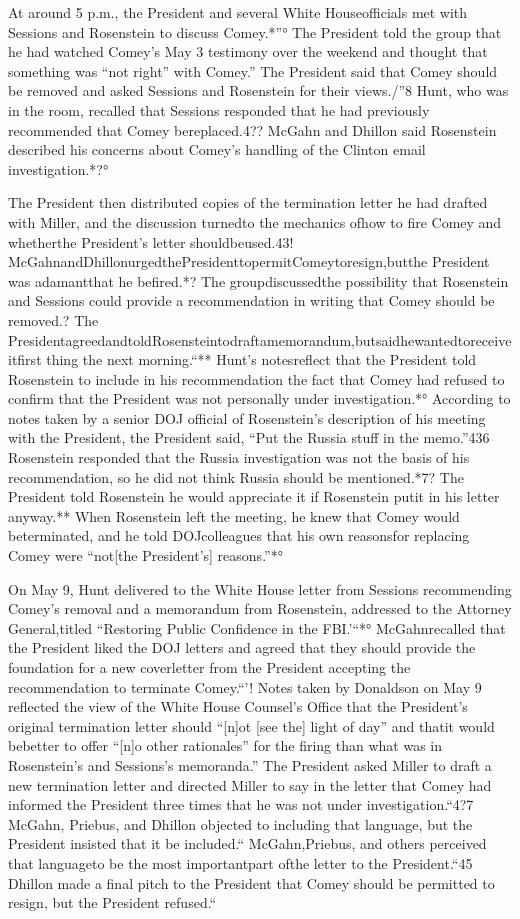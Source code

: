 {At around 5 p.m., the President and several White Houseofficials met with Sessions and Rosenstein to discuss Comey.*”° The President told the group that he had watched Comey’s May 3 testimony over the weekend and thought that something was “not right” with Comey.” The President said that Comey should be removed and asked Sessions and Rosenstein for their views./”8 Hunt, who was in the room, recalled that Sessions responded that he had previously recommended that Comey bereplaced.4?? McGahn and Dhillon said Rosenstein described his concerns about Comey’s handling of the Clinton email investigation.*?°

The President then distributed copies of the termination letter he had drafted with Miller, and the discussion turnedto the mechanics ofhow to fire Comey and whetherthe President’s letter shouldbeused.43! McGahnandDhillonurgedthePresidenttopermitComeytoresign,butthe President was adamantthat he befired.*? The groupdiscussedthe possibility that Rosenstein and Sessions could provide a recommendation in writing that Comey should be removed.? The PresidentagreedandtoldRosensteintodraftamemorandum,butsaidhewantedtoreceiveitfirst thing the next morning.“** Hunt’s notesreflect that the President told Rosenstein to include in his recommendation the fact that Comey had refused to confirm that the President was not personally under investigation.*° According to notes taken by a senior DOJ official of Rosenstein’s description of his meeting with the President, the President said, “Put the Russia stuff in the memo.”436 Rosenstein responded that the Russia investigation was not the basis of his recommendation, so he did not think Russia should be mentioned.*7? The President told Rosenstein he would appreciate it if Rosenstein putit in his letter anyway.** When Rosenstein left the meeting, he knew that Comey would beterminated, and he told DOJcolleagues that his own reasonsfor replacing Comey were “not[the President’s] reasons.”*°

On May 9, Hunt delivered to the White House letter from Sessions recommending Comey’s removal and a memorandum from Rosenstein, addressed to the Attorney General,titled “Restoring Public Confidence in the FBI.’“*° McGahnrecalled that the President liked the DOJ letters and agreed that they should provide the foundation for a new coverletter from the President accepting the recommendation to terminate Comey.“'! Notes taken by Donaldson on May 9 reflected the view of the White House Counsel’s Office that the President’s original termination letter should “[n]ot [see the] light of day” and thatit would bebetter to offer “[n]o other rationales” for the firing than what was in Rosenstein’s and Sessions’s memoranda.” The President asked Miller to draft a new termination letter and directed Miller to say in the letter that Comey had informed the President three times that he was not under investigation.“4?7 McGahn, Priebus, and Dhillon objected to including that language, but the President insisted that it be included.“ McGahn,Priebus, and others perceived that languageto be the most importantpart ofthe letter to the President.“45 Dhillon made a final pitch to the President that Comey should be permitted to resign, but the President refused.“

}

